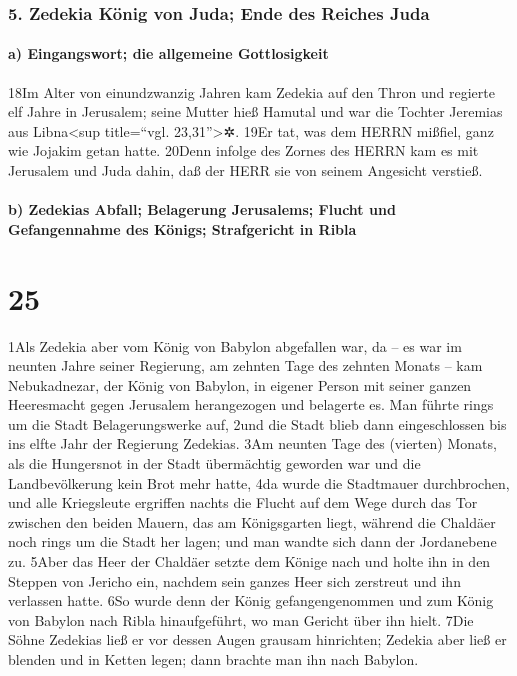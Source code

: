 \hypertarget{zedekia-kuxf6nig-von-juda-ende-des-reiches-juda}{%
\subsubsection{5. Zedekia König von Juda; Ende des Reiches
Juda}\label{zedekia-kuxf6nig-von-juda-ende-des-reiches-juda}}

\hypertarget{a-eingangswort-die-allgemeine-gottlosigkeit}{%
\paragraph{a) Eingangswort; die allgemeine
Gottlosigkeit}\label{a-eingangswort-die-allgemeine-gottlosigkeit}}

18Im Alter von einundzwanzig Jahren kam Zedekia auf den Thron und
regierte elf Jahre in Jerusalem; seine Mutter hieß Hamutal und war die
Tochter Jeremias aus Libna\textless sup title=``vgl.
23,31''\textgreater✲. 19Er tat, was dem HERRN mißfiel, ganz wie Jojakim
getan hatte. 20Denn infolge des Zornes des HERRN kam es mit Jerusalem
und Juda dahin, daß der HERR sie von seinem Angesicht verstieß.

\hypertarget{b-zedekias-abfall-belagerung-jerusalems-flucht-und-gefangennahme-des-kuxf6nigs-strafgericht-in-ribla}{%
\paragraph{b) Zedekias Abfall; Belagerung Jerusalems; Flucht und
Gefangennahme des Königs; Strafgericht in
Ribla}\label{b-zedekias-abfall-belagerung-jerusalems-flucht-und-gefangennahme-des-kuxf6nigs-strafgericht-in-ribla}}

\hypertarget{section-24}{%
\section{25}\label{section-24}}

1Als Zedekia aber vom König von Babylon abgefallen war, da -- es war im
neunten Jahre seiner Regierung, am zehnten Tage des zehnten Monats --
kam Nebukadnezar, der König von Babylon, in eigener Person mit seiner
ganzen Heeresmacht gegen Jerusalem herangezogen und belagerte es. Man
führte rings um die Stadt Belagerungswerke auf, 2und die Stadt blieb
dann eingeschlossen bis ins elfte Jahr der Regierung Zedekias. 3Am
neunten Tage des (vierten) Monats, als die Hungersnot in der Stadt
übermächtig geworden war und die Landbevölkerung kein Brot mehr hatte,
4da wurde die Stadtmauer durchbrochen, und alle Kriegsleute ergriffen
nachts die Flucht auf dem Wege durch das Tor zwischen den beiden Mauern,
das am Königsgarten liegt, während die Chaldäer noch rings um die Stadt
her lagen; und man wandte sich dann der Jordanebene zu. 5Aber das Heer
der Chaldäer setzte dem Könige nach und holte ihn in den Steppen von
Jericho ein, nachdem sein ganzes Heer sich zerstreut und ihn verlassen
hatte. 6So wurde denn der König gefangengenommen und zum König von
Babylon nach Ribla hinaufgeführt, wo man Gericht über ihn hielt. 7Die
Söhne Zedekias ließ er vor dessen Augen grausam hinrichten; Zedekia aber
ließ er blenden und in Ketten legen; dann brachte man ihn nach Babylon.

